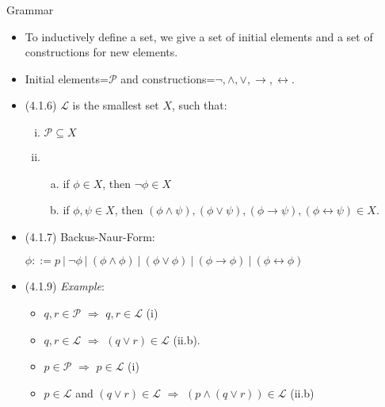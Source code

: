 \begin{frame}{Grammar}
	
	\begin{itemize}
	
		 \item \alert{To inductively define a set, we give a set of initial elements and a set of constructions for new elements.}
		 
		 \item Initial elements=$\mathcal{P}$ and constructions=$\neg,\land,\lor,\to,\leftrightarrow$.

		\item (4.1.6) $\mathcal{L}$ is the smallest set $X$, such that:
		\begin{enumerate}[(i)]
		
			\item $\mathcal{P}\subseteq X$
			
			\item \begin{enumerate}[(a)]

					\item if $\phi\in X$, then $\neg \phi\in X$
					
					\item if $\phi,\psi\in X$, then $(\phi\land\psi), (\phi\lor\psi),(\phi\to\psi),(\phi\leftrightarrow\psi)\in X$.
		
				\end{enumerate}
					
		\end{enumerate}
				
		\item  (4.1.7) Backus-Naur-Form:
				
		\begin{center}
		$\phi::=p~|~\neg \phi~|~(\phi\land\phi)~|~(\phi\lor\phi)~|~(\phi\to\phi)~|~(\phi\leftrightarrow\phi)$
		\end{center}
		
		\item (4.1.9) \emph{Example}: 
			\begin{itemize}
				\item $q,r\in\mathcal{P}$ $\Rightarrow$ $q,r\in\mathcal{L}$ (i)
				
				\item $q,r\in\mathcal{L}$ $\Rightarrow$ $(q\lor r)\in\mathcal{L}$ (ii.b). 
				
				\item $p\in\mathcal{P}$ $\Rightarrow$ $p\in\mathcal{L}$ (i)
				
				\item $p\in\mathcal{L}$ and $(q\lor r)\in\mathcal{L}$ $\Rightarrow$ $(p\land (q\lor r))\in\mathcal{L}$ (ii.b)
		
			\end{itemize}
		
	\end{itemize}
		
\end{frame}

